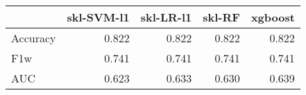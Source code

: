 \begin{tabular}{lrrrr}
\toprule
{} &  skl-SVM-l1 &  skl-LR-l1 &  skl-RF &  xgboost \\
\midrule
Accuracy &       0.822 &      0.822 &   0.822 &    0.822 \\
F1w      &       0.741 &      0.741 &   0.741 &    0.741 \\
AUC      &       0.623 &      0.633 &   0.630 &    0.639 \\
\bottomrule
\end{tabular}
